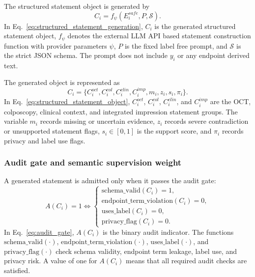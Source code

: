 The structured statement object is generated by
\begin{equation}
C_i=f_{\psi}(E_i^{safe},P,\mathcal{S}).
\label{eq:structured_statement_generation}
\end{equation}
In Eq.~\eqref{eq:structured_statement_generation}, $C_i$ is the generated structured statement object, $f_{\psi}$ denotes the external LLM API based statement construction function with provider parameters $\psi$, $P$ is the fixed label free prompt, and $\mathcal{S}$ is the strict JSON schema. The prompt does not include $y_i$ or any endpoint derived text.

The generated object is represented as
\begin{equation}
C_i=\{C_i^{oct},C_i^{col},C_i^{clin},C_i^{imp},m_i,z_i,s_i,\pi_i\}.
\label{eq:structured_statement_object}
\end{equation}
In Eq.~\eqref{eq:structured_statement_object}, $C_i^{oct}$, $C_i^{col}$, $C_i^{clin}$, and $C_i^{imp}$ are the OCT, colposcopy, clinical context, and integrated impression statement groups. The variable $m_i$ records missing or uncertain evidence, $z_i$ records severe contradiction or unsupported statement flags, $s_i\in[0,1]$ is the support score, and $\pi_i$ records privacy and label use flags.

\subsubsection{Audit gate and semantic supervision weight}
\label{subsubsec:audit_gate_semantic_weight}

A generated statement is admitted only when it passes the audit gate:
\begin{equation}
A(C_i)=1
\Longleftrightarrow
\begin{cases}
\mathrm{schema\_valid}(C_i)=1,\\
\mathrm{endpoint\_term\_violation}(C_i)=0,\\
\mathrm{uses\_label}(C_i)=0,\\
\mathrm{privacy\_flag}(C_i)=0.
\end{cases}
\label{eq:audit_gate}
\end{equation}
In Eq.~\eqref{eq:audit_gate}, $A(C_i)$ is the binary audit indicator. The functions $\mathrm{schema\_valid}(\cdot)$, $\mathrm{endpoint\_term\_violation}(\cdot)$, $\mathrm{uses\_label}(\cdot)$, and $\mathrm{privacy\_flag}(\cdot)$ check schema validity, endpoint term leakage, label use, and privacy risk. A value of one for $A(C_i)$ means that all required audit checks are satisfied.

